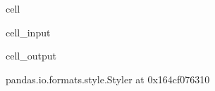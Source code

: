 \documentclass[letterpaper,10pt,english]{jupyterBook}
\begin{document}
\begin{sphinxuseclass}{cell}\begin{sphinxVerbatimInput}

\begin{sphinxuseclass}{cell_input}
\begin{sphinxVerbatim}[commandchars=\\\{\}]
 
\end{sphinxVerbatim}

\end{sphinxuseclass}\end{sphinxVerbatimInput}
\begin{sphinxVerbatimOutput}

\begin{sphinxuseclass}{cell_output}
\begin{sphinxVerbatim}[commandchars=\\\{\}]
\PYGZlt{}pandas.io.formats.style.Styler at 0x164cf076310\PYGZgt{}
\end{sphinxVerbatim}

\end{sphinxuseclass}\end{sphinxVerbatimOutput}

\end{sphinxuseclass}
\end{document}
